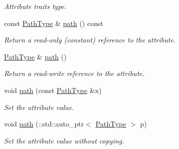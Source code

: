 \begin{DoxyCompactItemize}
\begin{DoxyCompactList}\small\item\em Attribute traits type. \item\end{DoxyCompactList}\item 
const \hyperlink{classopenstack_1_1xml_1_1FileName}{PathType} \& \hyperlink{classopenstack_1_1xml_1_1File_a57fb2e8be6f706c385ed4c9f0eb9d50b}{path} () const 
\begin{DoxyCompactList}\small\item\em Return a read-\/only (constant) reference to the attribute. \item\end{DoxyCompactList}\item 
\hyperlink{classopenstack_1_1xml_1_1FileName}{PathType} \& \hyperlink{classopenstack_1_1xml_1_1File_a2a528e289b7e044264216fd7ddf8df89}{path} ()
\begin{DoxyCompactList}\small\item\em Return a read-\/write reference to the attribute. \item\end{DoxyCompactList}\item 
void \hyperlink{classopenstack_1_1xml_1_1File_a5b19285500e52268dfe0b58e08991db5}{path} (const \hyperlink{classopenstack_1_1xml_1_1FileName}{PathType} \&x)
\begin{DoxyCompactList}\small\item\em Set the attribute value. \item\end{DoxyCompactList}\item 
void \hyperlink{classopenstack_1_1xml_1_1File_a3b9b17e4e9d1beb6a59e6ae26b60355c}{path} (::std::auto\_\-ptr$<$ \hyperlink{classopenstack_1_1xml_1_1FileName}{PathType} $>$ p)
\begin{DoxyCompactList}\small\item\em Set the attribute value without copying. \item\end{DoxyCompactList}\end{DoxyCompactItemize}
